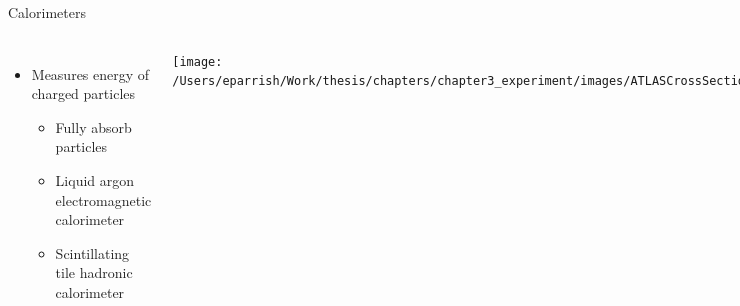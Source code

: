 \documentclass[aspectratio=169,xcolor=table]{beamer}
\begin{document}
    \begin{frame}[t]{Calorimeters}
     \begin{columns}[t]
        \begin{itemize}
          \item Measures energy of charged particles
          \begin{itemize}
              \item Fully absorb particles
              \item Liquid argon electromagnetic calorimeter 
              \item Scintillating tile hadronic calorimeter
          \end{itemize}
        \end{itemize}

      \centering
      \texttt{[image: /Users/eparrish/Work/thesis/chapters/chapter3\_experiment/images/ATLASCrossSectionDiagram.png]}

      \begin{figure}
        \begin{columns}
            \centering
            \texttt{[image: /Users/eparrish/Work/thesis/chapters/chapter3\_experiment/images/ATLAS\_Calorimeters\_Highlight\_Run2]}
            \caption{\tiny \cite{atlas-schematics}}
        \end{columns}
      \end{figure}
      \begin{figure}
        \texttt{[image: /Users/eparrish/Work/thesis/chapters/chapter3\_experiment/images/ATLAS\_Calorimeters\_Run2]}
        \caption{\tiny \cite{atlas-schematics}}
      \end{figure}
      \end{columns}
    \end{frame}
\end{document}
